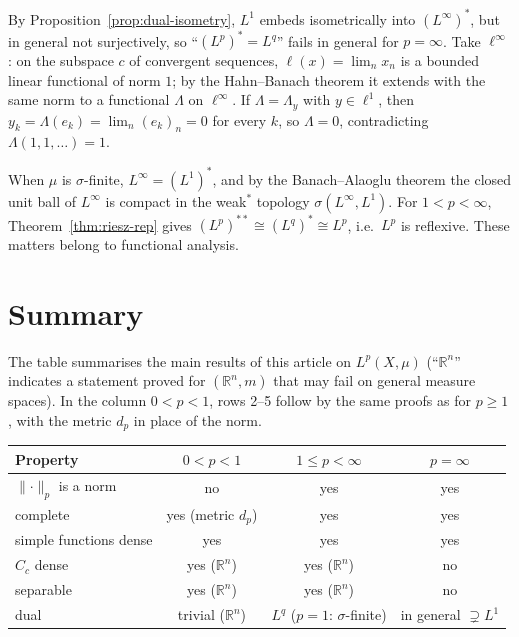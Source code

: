 \documentclass[11pt]{article}
\newcommand{\R}{\mathbb{R}}
\newcommand{\norm}[1]{\lVert #1\rVert}
\begin{document}
\begin{remark}[The case $p=\infty$]
By Proposition~\ref{prop:dual-isometry}, $L^{1}$ embeds isometrically into $(L^{\infty})^{*}$, but in general not surjectively, so ``$(L^{p})^{*}=L^{q}$'' fails in general for $p=\infty$. Take $\ell^{\infty}$: on the subspace $c$ of convergent sequences, $\ell(x)=\lim_{n}x_{n}$ is a bounded linear functional of norm $1$; by the Hahn--Banach theorem it extends with the same norm to a functional $\Lambda$ on $\ell^{\infty}$. If $\Lambda=\Lambda_{y}$ with $y\in\ell^{1}$, then $y_{k}=\Lambda(e_{k})=\lim_{n}(e_{k})_{n}=0$ for every $k$, so $\Lambda=0$, contradicting $\Lambda(1,1,\dots)=1$.
\end{remark}

\begin{remark}
When $\mu$ is $\sigma$-finite, $L^{\infty}=(L^{1})^{*}$, and by the Banach--Alaoglu theorem the closed unit ball of $L^{\infty}$ is compact in the weak$^{*}$ topology $\sigma(L^{\infty},L^{1})$. For $1<p<\infty$, Theorem~\ref{thm:riesz-rep} gives $(L^{p})^{**}\cong(L^{q})^{*}\cong L^{p}$, i.e.\ $L^{p}$ is reflexive. These matters belong to functional analysis.
\end{remark}

\section*{Summary}

The table summarises the main results of this article on $L^{p}(X,\mu)$ (``$\R^{n}$'' indicates a statement proved for $(\R^{n},m)$ that may fail on general measure spaces). In the column $0<p<1$, rows 2--5 follow by the same proofs as for $p\ge1$, with the metric $d_{p}$ in place of the norm.

\begin{center}
\small
\begin{tabular}{@{}lccc@{}}
\toprule
Property & $0<p<1$ & $1\le p<\infty$ & $p=\infty$\\
\midrule
$\norm{\cdot}_{p}$ is a norm & no & yes & yes\\
complete & yes (metric $d_{p}$) & yes & yes\\
simple functions dense & yes & yes & yes\\
$C_{c}$ dense & yes ($\R^{n}$) & yes ($\R^{n}$) & no\\
separable & yes ($\R^{n}$) & yes ($\R^{n}$) & no\\
dual & trivial ($\R^{n}$) & $L^{q}$ ($p=1$: $\sigma$-finite) & in general $\supsetneq L^{1}$\\
\bottomrule
\end{tabular}
\end{center}
\end{document}
